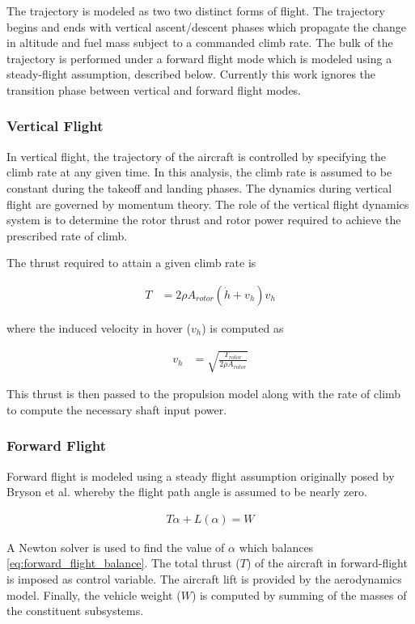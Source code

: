 
The trajectory is modeled as two two distinct forms of flight.
The trajectory begins and ends with vertical ascent/descent phases which propagate the change in altitude and fuel mass subject to a commanded climb rate.
The bulk of the trajectory is performed under a forward flight mode which is modeled using a steady-flight assumption, described below.
Currently this work ignores the transition phase between vertical and forward flight modes.

\subsubsection{Vertical Flight}

In vertical flight, the trajectory of the aircraft is controlled by specifying the climb rate at any given time.
In this analysis, the climb rate is assumed to be constant during the takeoff and landing phases.
The dynamics during vertical flight are governed by momentum theory\cite{leishman2006principles}.
The role of the vertical flight dynamics system is to determine the rotor thrust and rotor power required to achieve the prescribed rate of climb.

The thrust required to attain a given climb rate is

\begin{align}
    T &= 2 \rho A_{rotor} (\dot{h} + v_h) v_h \label{eq:climb_thrust}
\end{align}

where the induced velocity in hover ($v_h$) is computed as

\begin{align}
    v_h &= \sqrt{\frac{T_{rotor}}{2 \rho A_{rotor}}} \label{eq:hover_induced_velocity}
\end{align}

This thrust is then passed to the propulsion model along with the rate of climb to compute the necessary shaft input power.

\subsubsection{Forward Flight}

Forward flight is modeled using a steady flight assumption originally posed by Bryson et al. whereby the flight path angle is assumed to be nearly zero\cite{bryson1969energystate}.

\begin{align}
    T \alpha + L(\alpha) = W \label{eq:forward_flight_balance}
\end{align}

A Newton solver is used to find the value of $\alpha$ which balances \eqref{eq:forward_flight_balance}.
The total thrust ($T$) of the aircraft in forward-flight is imposed as control variable.
The aircraft lift is provided by the aerodynamics model.
Finally, the vehicle weight ($W$) is computed by summing of the masses of the constituent subsystems.
